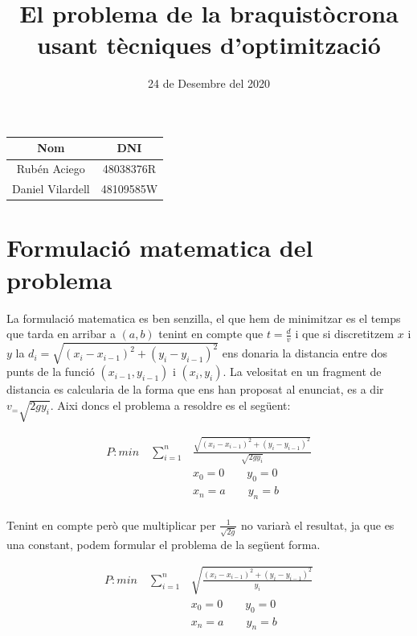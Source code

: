 \documentclass[12pt, a4papre]{article}
\author{}
\title{El problema de la braquistòcrona usant tècniques d'optimització}
\date{24 de Desembre del 2020}
\begin{document}
	\maketitle
	\begin{center}
		\begin{tabular}{ |c | c |}
			\hline
			\textbf{Nom} 		& \textbf{DNI}		\\ \hline
			Rubén Aciego 		&48038376R 		\\ 
			Daniel Vilardell 		&48109585W 		\\
			\hline
		\end{tabular}
	\end{center}
	\tableofcontents
	
	\newpage
	\section{Formulació matematica del problema}
	
	La formulació matematica es ben senzilla, el que hem de minimitzar es el temps que tarda en arribar a $(a, b)$ tenint en compte que $t = \frac{d}{v}$ i que si discretitzem $x$ i $y$  la $d_i=\sqrt{(x_i - x_{i - 1})^2 + (y_i - y_{i - 1})^2}$ ens donaria la distancia entre dos punts de la funció $(x_{i - 1}, y_{i - 1})$ i $(x_i, y_i)$. La velositat en un fragment de distancia es calcularia de la forma que ens han proposat al enunciat, es a dir $v_ =\sqrt{2gy_i}$. Aixi doncs el problema a resoldre es el següent:
	
	\begin{align*}
	P \colon	 min\quad \sum_{i = 1}^n& \frac{\sqrt{(x_i - x_{i - 1})^2 + (y_i - y_{i - 1})^2}} {\sqrt{2gy_i}}\\	
			&x_0 = 0 \qquad
			y_0 = 0\\
			&x_n = a \qquad
			y_n = b\\
	\end{align*}
	
	Tenint en compte però que multiplicar per $\frac{1}{\sqrt{2g}}$ no variarà el resultat, ja que es una constant, podem formular el problema de la següent forma.
	
	\begin{align*}
	P \colon	 min\quad \sum_{i = 1}^n& \sqrt{\frac{(x_i - x_{i - 1})^2 + (y_i - y_{i - 1})^2} {y_i}}\\	
			&x_0 = 0 \qquad
			y_0 = 0\\
			&x_n = a \qquad
			y_n = b\\
	\end{align*}
	
\end{document}
